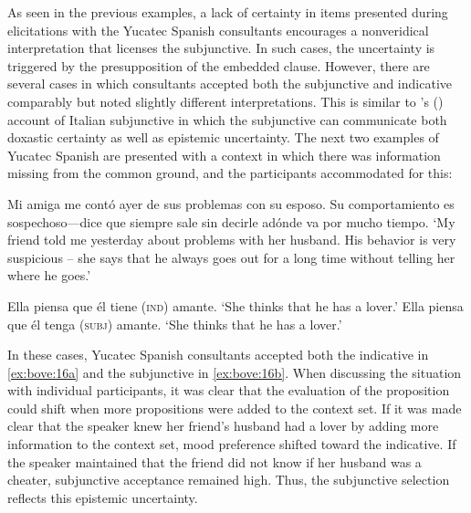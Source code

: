 \documentclass[output=paper,colorlinks,citecolor=brown,
]{langscibook}
\begin{document}
As seen in the previous examples, a lack of certainty in items presented during elicitations with the Yucatec Spanish consultants encourages a nonveridical interpretation that licenses the subjunctive. In such cases, the uncertainty is triggered by the presupposition of the embedded clause. However, there are several cases in which consultants accepted both the subjunctive and indicative comparably but noted slightly different interpretations. This is similar to \citeauthor{Mari2016}'s (\citeyear{Mari2016}) account of Italian subjunctive in which the subjunctive can communicate both doxastic certainty as well as epistemic uncertainty. The next two examples of Yucatec Spanish are presented with a context in which there was information missing from the common ground, and the participants accommodated for this:

\begin{exe} %
    \ex\label{ex:bove:16} 
 Mi amiga me contó ayer de sus problemas con su esposo. Su comportamiento es sospechoso—dice que siempre sale sin decirle adónde va por mucho tiempo.
 \glt `My friend told me yesterday about problems with her husband. His behavior is very suspicious -- she says that he always goes out for a long time without telling her where he goes.'
 
    \begin{xlist} %
        \ex \label{ex:bove:16a}
           Ella piensa que él tiene (\textsc{ind}) amante.%
                   \glt `She thinks that he has a lover.'
        \ex\label{ex:bove:16b}
           Ella piensa que él tenga (\textsc{subj}) amante.
             \glt `She thinks that he has a lover.'
\end{xlist}
\end{exe}


In these cases, Yucatec Spanish consultants accepted both the indicative in \ref{ex:bove:16a} and the subjunctive in \ref{ex:bove:16b}. When discussing the situation with individual participants, it was clear that the evaluation of the proposition could shift when more propositions were added to the context set. If it was made clear that the speaker knew her friend's husband had a lover by adding more information to the context set, mood preference shifted toward the indicative. If the speaker maintained that the friend did not know if her husband was a cheater, subjunctive acceptance remained high. Thus, the subjunctive selection reflects this epistemic uncertainty.
\end{document}
